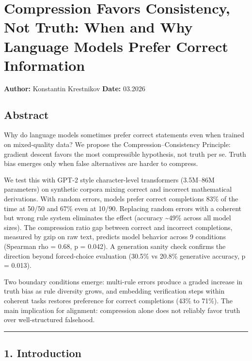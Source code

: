 \documentclass[
  11pt,
]{article}
\author{}
\date{}
\begin{document}
\section{Compression Favors Consistency, Not Truth: When and Why
Language Models Prefer Correct
Information}\label{compression-favors-consistency-not-truth-when-and-why-language-models-prefer-correct-information}

\textbf{Author:} Konstantin Krestnikov \textbf{Date:} 03.2026

\subsection{Abstract}\label{abstract}

Why do language models sometimes prefer correct statements even when
trained on mixed-quality data? We propose the Compression--Consistency
Principle: gradient descent favors the most compressible hypothesis, not
truth per se. Truth bias emerges only when false alternatives are harder
to compress.

We test this with GPT-2 style character-level transformers (3.5M--86M
parameters) on synthetic corpora mixing correct and incorrect
mathematical derivations. With random errors, models prefer correct
completions 83\% of the time at 50/50 and 67\% even at 10/90. Replacing
random errors with a coherent but wrong rule system eliminates the
effect (accuracy \textasciitilde49\% across all model sizes). The
compression ratio gap between correct and incorrect completions,
measured by gzip on raw text, predicts model behavior across 9
conditions (Spearman rho = 0.68, p = 0.042). A generation sanity check
confirms the direction beyond forced-choice evaluation (30.5\% vs 20.8\%
generative accuracy, p = 0.013).

Two boundary conditions emerge: multi-rule errors produce a graded
increase in truth bias as rule diversity grows, and embedding
verification steps within coherent tasks restores preference for correct
completions (43\% to 71\%). The main implication for alignment:
compression alone does not reliably favor truth over well-structured
falsehood.

\begin{center}\rule{0.5\linewidth}{0.5pt}\end{center}

\subsection{1. Introduction}\label{introduction}
\end{document}
